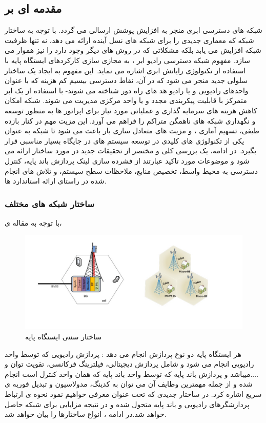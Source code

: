 \subsection{مقدمه ای بر }
شبکه های دسترسی ابری منجر به افزایش پوشش ارسالی می گردد. با توجه به ساختار شبکه
    که معماری جدیدی را برای شبکه های نسل آینده
ارائه می دهد، نه تنها ظرفیت شبکه افزایش می یابد بلکه
مشکلاتی که در روش های دیگر وجود دارد را نیز هموار
می سازد.
مفهوم شبکه دسترسی رادیو ابر ، به مجازی سازی کارکردهای ایستگاه  پایه  با استفاده از تکنولوژی رایانش ابری  اشاره می نماید. این مفهوم به ایجاد یک ساختار سلولی جدید منجر می شود که در آن، نقاط دسترسی بیسیم کم هزینه که با عنوان واحدهای رادیویی  و یا رادیو هد های
  راه دور 
 شناخته می شوند- با استفاده از یک ابر متمرکز با قابلیت پیکربندی مجدد و یا واحد مرکزی  مدیریت می شوند. شبکه امکان کاهش هزینه های سرمایه گذاری و عملیاتی مورد نیاز برای اپراتور ها به منظور توسعه و نگهداری شبکه های ناهمگن متراکم را فراهم می آورد. این مزیت مهم در کنار بازده طیفی، تسهیم آماری ، و مزیت های متعادل سازی بار باعث می شود تا شبکه  به عنوان یکی از تکنولوژی های کلیدی در توسعه سیستم های  در جایگاه بسیار مناسبی قرار بگیرد. در ادامه، یک بررسی کلی و مختصر از تحقیقات جدید در مورد ساختار  ارائه می شود و موضوعات مورد تاکید عبارتند از فشرده سازی لینک  پردازش باند پایه، کنترل دسترسی به محیط واسط، تخصیص منابع، ملاحظات سطح سیستم، و تلاش های انجام شده در راستای ارائه استاندارد ها.
\subsubsection{ساختار شبکه های مختلف }
با توجه به مقاله ی\cite{checko2015cloud}،
\begin{figure}
  \centering
    \includegraphics[scale=0.7]{./fig/c11}
  \caption{ساختار سنتی ایستگاه پایه \cite{checko2015cloud}}
  \label{fig:c11}
\end{figure}
هر ایستگاه پایه دو نوع پردازش انجام می دهد : پردازش
رادیویی که توسط واحد رادیویی  انجام می شود و شامل پردازش
دیجیتالی، فیلترینگ فرکانسی، تقویت توان و ....میباشد و
پردازش باند پایه که توسط واحد باند پایه  که همان واحد کنترل است  انجام شده و از جمله
مهمترین وظایف آن می توان به کدینگ، مدولاسیون و
تبدیل فوریه ی سریع اشاره کرد. در ساختار جدیدی که
تحت عنوان   معرفی خواهیم نمود نحوه ی ارتباط
پردازشگرهای رادیویی و باند پایه متحول شده و در نتیجه
مزایایی برای شبکه حاصل خواهد شد.در ادامه ، انواع ساختارها را بیان خواهد شد.
